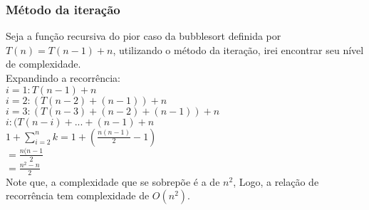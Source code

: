 \subsubsection{Método da iteração}
Seja a função recursiva do pior caso da bubblesort definida por $T(n) = T(n-1) + n$, utilizando o método da iteração, irei encontrar seu nível de complexidade. \\
Expandindo a recorrência: \\
$i = 1 : T(n - 1) + n$ \\
$i = 2 : (T(n - 2) + (n -1)) + n$ \\
$i = 3 : (T(n - 3) + (n - 2) + (n - 1)) + n$ \\
$i : (T(n - i) + ... + (n - 1) + n$ \\
$1 + \sum_{i=2}^{n}k = 1 + (\frac{n(n-1)}{2} - 1)$ \\
$= \frac{n(n-1}{2}$ \\
$= \frac{n^2 - n}{2}$ \\
Note que, a complexidade que se sobrepõe é a de $n^2$, Logo, a relação de recorrência tem complexidade de $O(n^2)$.